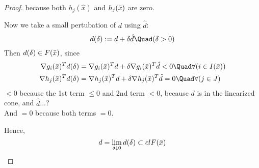 \begin{proof}
	because both $h_j(\hat x)$ and $h_j(\bar x)$ are zero.

	Now we take a small pertubation of $d$ using $\hat d$:
	$$
		d(\delta):= d + \delta\hat d\Quad(\delta>0)
	$$
	Then $d(\delta)\in F(\bar x)$, since
	\begin{align}
		\nabla g_i(\bx)^Td(\delta) & =\nabla g_i(\bx)^Td + \delta\nabla g_i(\bx)^T\hat d<0 \Quad\forall(i\in\Act) \\
		\nabla h_j(\bx)^Td(\delta) & =\nabla h_j(\bx)^Td + \delta\nabla h_j(\bx)^T\hat d=0 \Quad\forall(j\in J)
	\end{align}
	$<0$ because the 1st term $\leq0$ and 2nd term $<0$, because $d$ is
	in the linearized cone, and $\hat d$...? \\
	And $=0$ because both terms $=0$.

	Hence,
	$$
		d=\lim_{\delta\downarrow0}d(\delta) \subset clF(\bar x)
	$$
\end{proof}
